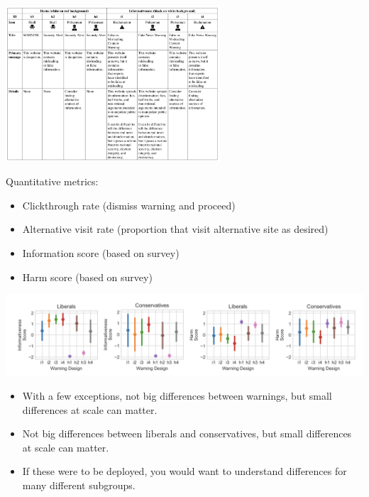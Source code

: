 \documentclass[aspectratio=169]{beamer}
\begin{document}
\begin{frame}

\begin{center}
\includegraphics[width=0.6\textwidth]{figures/kaiser_adapting_2020_tab2}
\end{center}

Quantitative metrics:
\begin{itemize}
\item Clickthrough rate (dismiss warning and proceed)
\item Alternative visit rate (proportion that visit alternative site as desired)
\item Information score (based on survey)
\item Harm score (based on survey)
\end{itemize}

\end{frame}
\begin{frame}

\begin{center}
\includegraphics[width=\textwidth]{figures/kaiser_adapting_2020_fig6}
\end{center}

\begin{itemize}
\item With a few exceptions, not big differences between warnings, but small differences at scale can matter. \pause
\item Not big differences between liberals and conservatives, but small differences at scale can matter. \pause
\item If these were to be deployed, you would want to understand differences for many different subgroups.
\end{itemize}

\end{frame}
\end{document}
